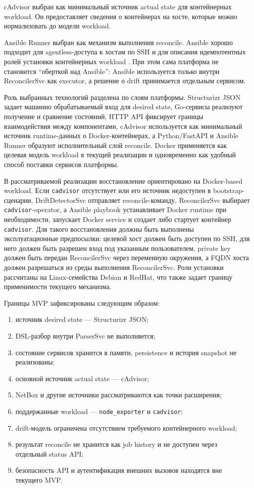 cAdvisor выбран как минимальный источник actual state для контейнерных workload. Он предоставляет сведения о контейнерах на хосте, которые можно нормализовать до модели workload.

Ansible Runner выбран как механизм выполнения reconcile. Ansible хорошо подходит для agentless-доступа к хостам по SSH и для описания идемпотентных ролей установки контейнерных workload \cite{ansible_docs}. При этом сама платформа не становится ``оберткой над Ansible'': Ansible используется только внутри ReconcilerSvc как executor, а решение о drift принимается отдельным сервисом.

Роль выбранных технологий разделена по слоям платформы. Structurizr JSON задает машинно обрабатываемый вход для desired state, Go-сервисы реализуют получение и сравнение состояний, HTTP API фиксирует границы взаимодействия между компонентами, cAdvisor используется как минимальный источник runtime-данных о Docker-контейнерах, а Python/FastAPI и Ansible Runner образуют исполнительный слой reconcile. Docker применяется как целевая модель workload в текущей реализации и одновременно как удобный способ поставки сервисов платформы.

В рассматриваемой реализации восстановление ориентировано на Docker-based workload. Если \texttt{cadvisor} отсутствует или его источник недоступен в bootstrap-сценарии, DriftDetectorSvc отправляет reconcile-команду, ReconcilerSvc выбирает \texttt{cadvisor}-operator, а Ansible playbook устанавливает Docker runtime при необходимости, запускает Docker service и создает либо стартует контейнер \texttt{cadvisor}. Для такого восстановления должны быть выполнены эксплуатационные предпосылки: целевой хост должен быть доступен по SSH, для него должен быть разрешен вход под указанным пользователем, private key должен быть передан ReconcilerSvc через переменную окружения, а FQDN хоста должен разрешаться из среды выполнения ReconcilerSvc. Роли установки рассчитаны на Linux-семейства Debian и RedHat, что также задает границу применимости текущего механизма.

Границы MVP зафиксированы следующим образом:
\begin{enumerate}
    \item источник desired state --- Structurizr JSON;
    \item DSL-разбор внутри ParserSvc не выполняется;
    \item состояние сервисов хранится в памяти, persistence и история snapshot не реализованы;
    \item основной источник actual state --- cAdvisor;
    \item NetBox и другие источники рассматриваются как точки расширения;
    \item поддержанные workload --- \texttt{node\_exporter} и \texttt{cadvisor};
    \item drift-модель ограничена отсутствием требуемого контейнерного workload;
    \item результат reconcile не хранится как job history и не доступен через отдельный status API;
    \item безопасность API и аутентификация внешних вызовов находятся вне текущего MVP.
\end{enumerate}

